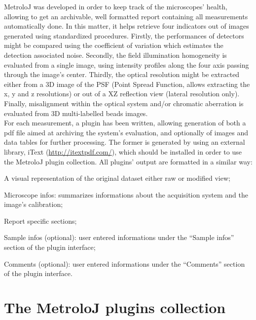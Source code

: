 \documentclass[]{spie}
\begin{document}
MetroloJ was developed in order to keep track of the microscopes' health, allowing to get an archivable, well formatted report containing all measurements automatically done.
In this matter, it helps retrieve four indicators out of images generated using standardized procedures. Firstly, the performances of detectors might be compared using the coefficient of variation which estimates the detection associated noise. Secondly, the field illumination homogeneity is evaluated from a single image, using intensity profiles along the four axis passing through the image's center. Thirdly, the optical resolution might be extracted either from a 3D image of the PSF (Point Spread Function, allows extracting the x, y and z resolutions) or out of a XZ reflection view (lateral resolution only). Finally, misalignment within the optical system and/or chromatic aberration is evaluated from 3D multi-labelled beads images.\\
For each measurement, a plugin has been written, allowing generation of both a pdf file aimed at archiving the system's evaluation, and optionally of images and data tables for further processing. The former is generated by using an external library, iText (\href{http://itextpdf.com/}{http://itextpdf.com/}), which should be installed in order to use the MetroloJ plugin collection. All plugins' output are formatted in a similar way:
\begin{enumerate*}
	\item A visual representation of the original dataset either raw or modified view;
	\item Microscope infos: summarizes informations about the acquisition system and the image's calibration;
	\item Report specific sections;
	\item Sample infos (optional): user entered informations under the ``Sample infos'' section of the plugin interface;
	\item Comments (optional): user entered informations under the ``Comments'' section of the plugin interface.
\end{enumerate*}

\section{The MetroloJ plugins collection}
\label{sec:pgCollec}

\end{document}
